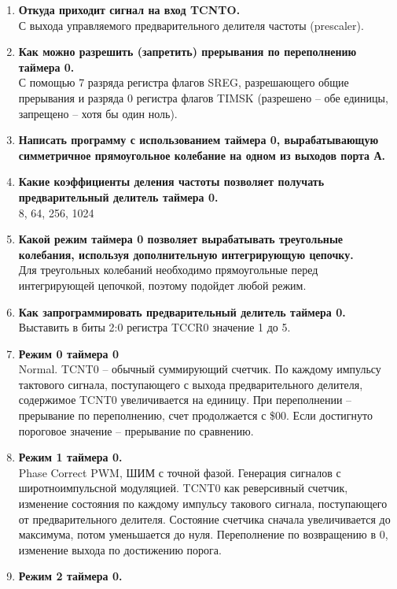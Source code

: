 \documentclass[a4paper, 12pt, twoside]{article}
\begin{document}
\begin{enumerate}
{команды OUT.}\\
		Режимы ШИМ (1 и 3).
	\item \textbf{Откуда приходит сигнал на вход TCNTO.}\\
		С выхода управляемого предварительного делителя частоты (prescaler).
	\item \textbf{Как можно разрешить (запретить) прерывания по переполнению таймера
0.}\\
С помощью 7 разряда регистра флагов SREG, разрешающего общие прерывания и
разряда 0 регистра флагов TIMSK (разрешено – обе единицы, запрещено – хотя бы
один ноль).
	\item \textbf{Написать программу с использованием таймера 0, вырабатывающую симметричное прямоугольное колебание на одном из выходов порта А.}
	\\
	\item \textbf{Какие коэффициенты деления частоты позволяет получать предварительный делитель таймера 0.}\\
		8, 64, 256, 1024
	\item \textbf{Какой режим таймера 0 позволяет вырабатывать треугольные колебания,
используя дополнительную интегрирующую цепочку.}\\
		Для треугольных колебаний необходимо прямоугольные перед интегрирующей цепочкой, поэтому подойдет любой режим.
	\item \textbf{Как запрограммировать предварительный делитель таймера 0.}\\
		Выставить в биты 2:0 регистра TCCR0 значение 1 до 5.
	\item \textbf{Режим 0 таймера 0}\\
		Normal. TCNT0 – обычный суммирующий счетчик. По каждому импульсу тактового сигнала, поступающего с выхода предварительного делителя, содержимое TCNT0 увеличивается на единицу. При переполнении – прерывание по переполнению, счет продолжается с \$00. Если достигнуто пороговое значение – прерывание по сравнению.
	\item \textbf{Режим 1 таймера 0.}\\
		Phase Correct PWM, ШИМ с точной фазой. Генерация сигналов с широтноимпульсной модуляцией. TCNT0 как реверсивный счетчик, изменение состояния по каждому импульсу такового сигнала, поступающего от предварительного делителя. Состояние счетчика сначала увеличивается до максимума, потом уменьшается до нуля. Переполнение по возвращению в 0, изменение выхода по достижению порога.
	\item \textbf{Режим 2 таймера 0.}\\

\end{enumerate}
\end{document}
